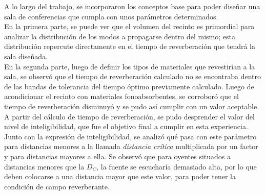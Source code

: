 A lo largo del trabajo, se incorporaron los conceptos base para poder diseñar una sala de conferencias que cumpla con unos parámetros determinados.\\

En la primera parte, se puede ver que el volumen del recinto es primordial para analizar la distribución de los modos a propagarse dentro del mismo; esta distribución repercute directamente en el tiempo de reverberación que tendrá la sala diseñada.\\

En la segunda parte, luego de definir los tipos de materiales que revestirían a la sala, se observó que el tiempo de reverberación calculado no se encontraba dentro de las bandas de tolerancia del tiempo óptimo previamente calculado. Luego de acondicionar el recinto con materiales fonoabsorbentes, se corroboró que el tiempo de reverberación disminuyó y se pudo así cumplir con un valor aceptable.\\

A partir del cálculo de tiempo de reverberación, se pudo desprender el valor del nivel de inteligibilidad, que fue el objetivo final a cumplir en esta experiencia.\\

Junto con la expresión de inteligibilidad, se analizó qué pasa con este parámetro para distancias menores a la llamada \emph{distancia crítica} multiplicada por un factor y para distancias mayores a ella. Se observó que para oyentes situados a distancias menores que la $D_C$, la fuente se escucharía demasiado alta, por lo que deben colocarse a una distancia mayor que este valor, para poder tener la condición de campo reverberante.






